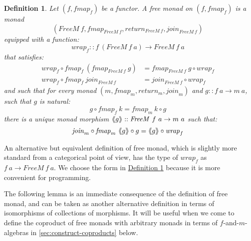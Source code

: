 \documentclass{jfp1}
\newcommand{\fmext}[1]{\langle\kern-0.25em\langle #1 \rangle\kern-0.25em\rangle}
\newtheorem{definition}{Definition}
\newcommand{\defref}[1]{\hyperref[#1]{Definition \ref*{#1}}}
\begin{document}
\begin{definition}\label{defn:freemonad}
  Let $(f, \mathit{fmap}_f)$ be a functor. A \emph{free monad} on
  $(f,\mathit{fmap}_f)$ is a monad
  \begin{displaymath}
    (\mathit{FreeM}~f, \mathit{fmap}_{\mathit{FreeM}~f}, \mathit{return}_{\mathit{FreeM}~f}, \mathit{join}_{\mathit{FreeM}~f})
  \end{displaymath}
  equipped with a function:
  \begin{displaymath}
    \mathit{wrap}_f :: f~(\mathit{FreeM}~f~a) \to \mathit{FreeM}~f~a
  \end{displaymath}
  that satisfies:
  \begin{align}
    \label{eq:wrap-natural}
    \mathit{wrap}_f \circ \mathit{fmap}_f~(\mathit{fmap}_{\mathit{FreeM}~f}~g) &= \mathit{fmap}_{\mathit{FreeM}~f}~g \circ \mathit{wrap}_f \\
    \label{eq:wrap-join}
    \mathit{wrap}_f \circ \mathit{fmap}_f~\mathit{join}_{\mathit{FreeM}~f} &= \mathit{join}_{\mathit{FreeM}~f} \circ \mathit{wrap}_f
  \end{align}
  and such that for every monad $(m, \mathit{fmap}_m,
  \mathit{return_m}, \mathit{join}_m)$ and $g :: f~a \to m~a$, such
  that $g$ is natural:
  \begin{displaymath}
    g \circ \mathit{fmap}_f~k = \mathit{fmap}_m~k \circ g
  \end{displaymath}
  there is a unique monad morphism $\fmext{g} :: \mathit{FreeM}~f~a
  \to m~a$ such that:
  \begin{displaymath}
    \mathit{join}_m \circ \mathit{fmap}_m~\fmext{g} \circ g = \fmext{g} \circ \mathit{wrap}_f
  \end{displaymath}
\end{definition}

An alternative but equivalent definition of free monad, which is
slightly more standard from a categorical point of view, has the type
of $\mathit{wrap}_f$ as $f~a \to \mathit{FreeM}~f~a$. We choose the
form in \defref{defn:freemonad} because it is more convenient for
programming.

The following lemma is an immediate consequence of the definition of
free monad, and can be taken as another alternative definition in
terms of isomorphisms of collections of morphisms. It will be useful
when we come to define the coproduct of free monads with arbitrary
monads in terms of $f$-and-$m$-algebras in
\autoref{sec:construct-coproducts} below.
\end{document}
